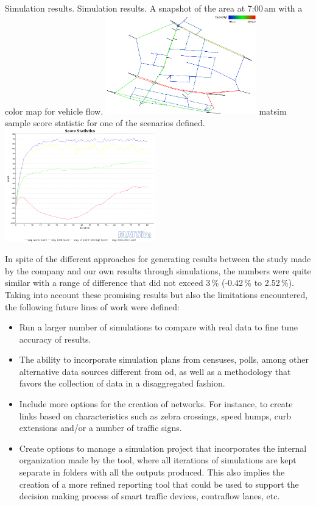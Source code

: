 \createfigure%
{Simulation results.}%
{Simulation results.}%
{\label{fig:caracasB}}%
{%
 \createsubfigure%
 {A snapshot of the area at 7:00\,am  with a color map for vehicle flow.}
 {\includegraphics[width=0.49\textwidth, angle=0]{./scenarios/figures/caracasB1.png}}
 {\label{fig:caracasBleft}}
\createsubfigure%
 {\gls{matsim} sample score statistic for one of the scenarios defined.}
 {\includegraphics[width=0.49\textwidth, angle=0]{./scenarios/figures/caracasB2.png}}
 {\label{fig:caracasBright}}
}%
{}

In spite of the different approaches for generating results between the study made by the company and our own results through simulations, the numbers were quite similar with a range of difference that did not exceed 3\,\% (-0.42\,\% to 2.52\,\%). Taking into account these promising results but also the limitations encountered, the following future lines of work were defined:

\begin{itemize}\styleItemize
\item Run a larger number of simulations to compare with real data to fine tune accuracy of results.

\item The ability to incorporate simulation plans from censuses, polls, among other alternative data sources different from \gls{od}, as well as a methodology that favors the collection of data in a disaggregated fashion.

\item Include more options for the creation of networks. For instance, to create links based on characteristics such as zebra crossings, speed humps, curb extensions and/or a number of traffic signs.

\item Create options to manage a simulation project that incorporates the internal organization made by the tool, where all iterations of simulations are kept separate in folders with all the outputs produced. This also implies the creation of a more refined reporting tool that could be used to support the decision making process of smart traffic devices, contraflow lanes, etc.
\end{itemize}


